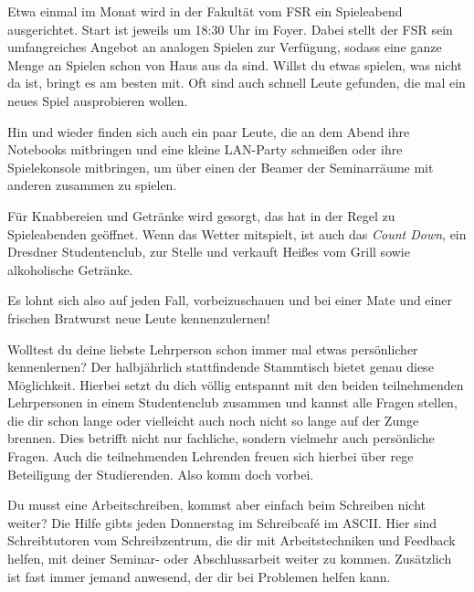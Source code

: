 

Etwa einmal im Monat wird in der Fakultät vom FSR ein Spieleabend ausgerichtet. Start ist jeweils um 18:30 Uhr im Foyer. Dabei stellt der FSR sein umfangreiches Angebot an analogen Spielen zur Verfügung, sodass eine ganze Menge an Spielen schon von Haus aus da sind. Willst du etwas spielen, was nicht da ist, bringt es am besten mit. Oft sind auch schnell Leute gefunden, die mal ein neues Spiel ausprobieren wollen.

Hin und wieder finden sich auch ein paar Leute, die an dem Abend ihre Notebooks mitbringen und eine kleine LAN-Party schmeißen oder ihre Spielekonsole mitbringen, um über einen der Beamer der Seminarräume mit anderen zusammen zu spielen.

Für Knabbereien und Getränke wird gesorgt, das \ascii{} hat in der Regel zu Spieleabenden geöffnet. Wenn das Wetter mitspielt, ist auch das \emph{Count Down}, ein Dresdner Studentenclub, zur Stelle und verkauft Heißes vom Grill sowie alkoholische Getränke.

Es lohnt sich also auf jeden Fall, vorbeizuschauen und bei einer Mate und einer frischen Bratwurst neue Leute kennenzulernen!


Wolltest du deine liebste Lehrperson schon immer mal etwas persönlicher kennenlernen? Der halbjährlich stattfindende Stammtisch bietet genau diese Möglichkeit. Hierbei setzt du dich völlig entspannt mit den beiden teilnehmenden Lehrpersonen in einem Studentenclub zusammen und kannst alle Fragen stellen, die dir schon lange oder vielleicht auch noch nicht so lange auf der Zunge brennen. Dies betrifft nicht nur fachliche, sondern vielmehr auch persönliche Fragen. Auch die teilnehmenden Lehrenden freuen sich hierbei über rege Beteiligung der Studierenden. Also komm doch vorbei.


Du musst eine Arbeitschreiben, kommst aber einfach beim Schreiben nicht weiter? Die Hilfe gibts jeden Donnerstag im Schreibcaf\'e im ASCII. Hier sind Schreibtutoren vom Schreibzentrum, die dir mit Arbeitstechniken und Feedback helfen, mit deiner Seminar- oder Abschlussarbeit weiter zu kommen. Zusätzlich ist fast immer jemand anwesend, der dir bei \latex Problemen helfen kann.


